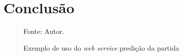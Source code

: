 \chapter{Conclusão}

\begin{figure}[H]
	
	\centering
	\caption{Exemplo de uso do \textit{web service} predição da partida}
	\qquad
	
	
	\small{Fonte: Autor.}
	\label{fig:web_service_predict}
\end{figure}